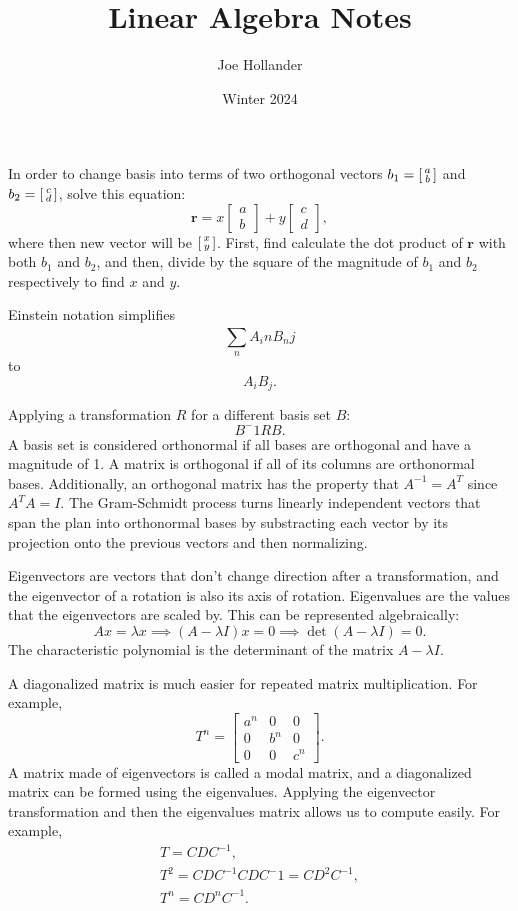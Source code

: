 \documentclass{article}
\title{Linear Algebra Notes}
\author{Joe Hollander}
\date{Winter 2024}
\begin{document}
\maketitle 

\newcommand{\tdv}[2]{
    \begin{bmatrix}
        #1 \\
        #2
    \end{bmatrix}}

\newcommand{\iltdv}[2]{
    \begin{bsmallmatrix}
        #1 \\
        #2
    \end{bsmallmatrix}}

In order to change basis into terms of two orthogonal vectors $b_1 = \iltdv{a}{b}$ and $b_2 = \iltdv{c}{d}$, 
solve this equation:
\[
\mathbf{r} = x\tdv{a}{b} + y\tdv{c}{d},
\]
where then new vector will be $\iltdv{x}{y}$. 
First, find calculate the dot product of $\mathbf{r}$ with both $b_1$ and $b_2$,
and then, divide by the square of the magnitude of $b_1$ and $b_2$ respectively to find $x$ and $y$.

Einstein notation simplifies
\[
\sum_{n}^{} A_in B_nj 
\]
to \[A_i B_j.\]

Applying a transformation $R$ for a different basis set $B$:
\[
B^-1 RB.
\]
A basis set is considered orthonormal if all bases are orthogonal and have a magnitude of 1.
A matrix is orthogonal if all of its columns are orthonormal bases.
Additionally, an orthogonal matrix has the property that $A^{-1} = A^T$ since $A^TA = I$.
The Gram-Schmidt process turns linearly independent vectors that span the plan
into orthonormal bases by substracting each vector by its projection onto the previous vectors
and then normalizing. 

Eigenvectors are vectors that don't change direction after a transformation,
and the eigenvector of a rotation is also its axis of rotation.
Eigenvalues are the values that the eigenvectors are scaled by.
This can be represented algebraically:
\[
Ax = \lambda x \implies (A - \lambda I)x = 0 \implies \det(A - \lambda I) = 0.
\]   
The characteristic polynomial is the determinant of the matrix $A - \lambda I$.

A diagonalized matrix is much easier for repeated matrix multiplication.
For example,
\[
T^n = 
\begin{bmatrix} 
    a^n & 0 & 0 \\
    0 & b^n & 0 \\
    0 & 0 & c^n
\end{bmatrix}.
\]
A matrix made of eigenvectors is called a modal matrix,
and a diagonalized matrix can be formed using the eigenvalues. 
Applying the eigenvector transformation and then the eigenvalues matrix
allows us to compute easily. For example, 
\begin{gather}
    T = CDC^{-1}, \nonumber \\ 
    T^2 = CDC^{-1}CDC^-1 = CD^2C^{-1}, \nonumber \\
    T^n  = CD^nC^{-1}. \nonumber
\end{gather}
\end{document}
